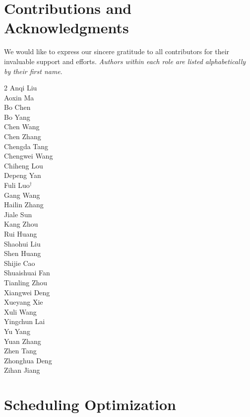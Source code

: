 \section{Contributions and Acknowledgments}
We would like to express our sincere gratitude to all contributors for their invaluable support and
efforts.
\textit{Authors within each role are listed alphabetically by their first name}.

{\renewcommand{\thefootnote}{\fnsymbol{footnote}}}

\begin{multicols}{2} %
\noindent
Anqi Liu \\
Aoxin Ma \\
Bo Chen \\
Bo Yang \\
Chen Wang \\
Chen Zhang \\
Chengda Tang \\
Chengwei Wang \\
Chiheng Lou \\
Depeng Yan \\
Fuli Luo$^\dagger$ \\
Gang Wang \\
Hailin Zhang \\
Jiale Sun \\
Kang Zhou \\

Rui Huang \\
Shaohui Liu \\
Shen Huang \\
Shijie Cao \\  
Shuaishuai Fan \\
Tianling Zhou \\
Xiangwei Deng \\
Xueyang Xie \\
Xuli Wang \\
Yingchun Lai \\
Yu Yang \\
Yuan Zhang \\
Zhen Tang \\
Zhonghua Deng \\
Zihan Jiang \\

\end{multicols} %

\newpage
\section{Scheduling Optimization}

